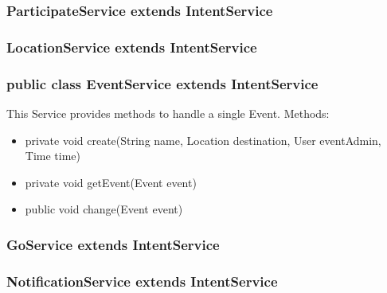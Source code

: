 	\subsubsection {ParticipateService extends IntentService}
	\subsubsection {LocationService extends IntentService }
	\subsubsection {public class EventService extends IntentService}
	This Service provides methods to handle a single Event.
	\newline Methods:
	\begin{itemize}
	\item private void create(String name, Location destination, User eventAdmin, Time time)
	\item private void getEvent(Event event)
	\item public void change(Event event)
	\end{itemize}
	\subsubsection {GoService extends IntentService}
	\subsubsection {NotificationService extends IntentService}
	

